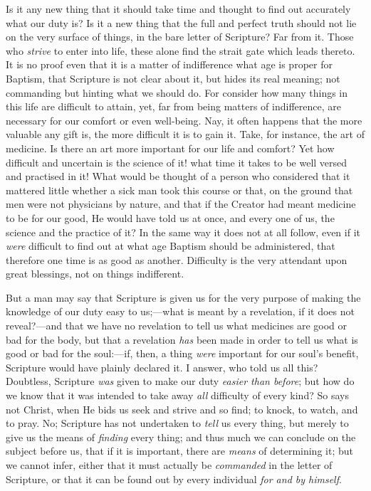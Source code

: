 Is it any new thing that it should take time and
thought to find out accurately what our duty is? Is it a
new thing that the full and perfect truth should not lie
on the very surface of things, in the bare letter of
Scripture? Far from it. Those who \emph{strive} to
enter into life, these alone find the strait gate which
leads thereto. It is no proof even that it is a matter of
indifference what age is proper for Baptism, that
Scripture is not clear about it, but hides its real
meaning; not commanding but hinting what we should do.
For consider how many things in this life are difficult
to attain, yet, far from being matters of indifference,
are necessary for our comfort or even well-being. Nay, it
often happens that the more valuable any gift is, the
more difficult it is to gain it. Take, for instance, the
art of medicine. Is there an art more important for our
life and comfort? Yet how difficult and uncertain is the
science of it! what time it takes to be well versed and
practised in it! What would be thought of a person who
considered that it mattered little whether a sick man
took this course or that, on the ground that men were not
physicians by nature, and that if the Creator had meant
medicine to be for our good, He would have told us at
once, and every one of us, the science and the practice
of it? In the same way it does not at all follow, even if
it \emph{were} difficult to find out at what age
Baptism should be administered, that therefore one time
is as good as another. Difficulty is the very attendant
upon great blessings, not on things indifferent.

But a man may say that Scripture is given us for the
very purpose of making the knowledge of our duty easy to
us;—what is meant by a revelation, if it does not
reveal?—and that we have no revelation to tell us
what medicines are good or bad for the body, but that a
revelation \emph{has} been made in order to tell us
what is good or bad for the soul:—if, then, a thing \emph{were}
important for our soul's benefit, Scripture would have
plainly declared it. I answer, who told us all this?
Doubtless, Scripture \emph{was} given to make our duty \emph{easier
than before}; but how do we know that it was intended
to take away \emph{all} difficulty of every kind? So
says not Christ, when He bids us seek and strive and so
find; to knock, to watch, and to pray. No; Scripture has
not undertaken to \emph{tell} us every thing, but
merely to give us the means of \emph{finding} every
thing; and thus much we can conclude on the subject
before us, that if it is important, there are \emph{means}
of determining it; but we cannot infer, either that it
must actually be \emph{commanded} in the letter of
Scripture, or that it can be found out by every
individual \emph{for and by himself}.

